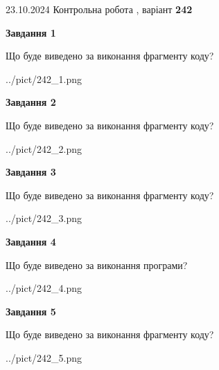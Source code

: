 \documentclass[12pt, ukrainian]{article}
\begin{document}
{\Large{23.10.2024 Контрольна робота , варіант  \No \textbf { 242 }\par}}
{
\begin {large}
{\begin {center}\textbf{Завдання 1}\end {center}}

Що буде виведено за виконання фрагменту коду?\par
\begin{center}
	{../pict/242_1.png}
\end{center}
\newpage

{\begin {center}\textbf{Завдання 2}\end {center}}

Що буде виведено за виконання фрагменту коду?\par
\begin{center}
	{../pict/242_2.png}
\end{center}
\newpage

{\begin {center}\textbf{Завдання 3}\end {center}}

Що буде виведено за виконання фрагменту коду?\par
\begin{center}
	{../pict/242_3.png}
\end{center}
\newpage

{\begin {center}\textbf{Завдання 4}\end {center}}

Що буде виведено за виконання програми?\par
\begin{center}
	{../pict/242_4.png}
\end{center}
\newpage

{\begin {center}\textbf{Завдання 5}\end {center}}

Що буде виведено за виконання фрагменту коду?\par
\begin{center}
	{../pict/242_5.png}
\end{center}
\newpage


\end{large}}
\end{document}
